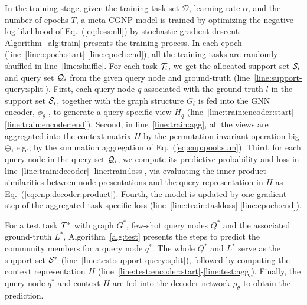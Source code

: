 In the training stage, given the training task set $\mathcal{D}$, learning rate $\alpha$, and the number of epochs $T$, a meta CGNP model is trained by optimizing the negative log-likelihood of Eq.~(\ref{eq:loss:nll}) by stochastic gradient descent. 
Algorithm~\ref{alg:train} presents the training process. 
In each epoch (line~\ref{line:epoch:start}-\ref{line:epoch:end}), all the training tasks are randomly shuffled in line~\ref{line:shuffle}.
For each task $\mathcal{T}_i$, we get the allocated support set $\mathcal{S}_i$ and query set $\mathcal{Q}_i$ from the given query node and ground-truth (line~\ref{line:support-query:split}).  
First, each query node $q$ associated with the ground-truth $l$ in the support set $\mathcal{S}_i$, together with the graph structure $G_i$ is fed into the GNN encoder, $\phi_\theta$ , to generate a query-specific view $H_q$ (line~\ref{line:train:encoder:start}-\ref{line:train:encoder:end}).
Second, in line~\ref{line:train:agg}, all the views are aggregated into the context matrix $H$ by the permutation-invariant operation big $\oplus$, e.g., by the summation aggregation of Eq.~(\ref{eq:cnp:pool:sum}). 
Third, for each query node in the query set $\mathcal{Q}_i$, 
we compute its predictive probability and loss in line~\ref{line:train:decoder}-\ref{line:train:loss}, via evaluating the inner product similarities between node presentations and the query representation in $H$ as Eq.~(\ref{eq:cnp:decoder:product}).
Fourth, the model is updated by one gradient step of the aggregated task-specific loss (line~\ref{line:train:taskloss}-\ref{line:epoch:end}).

	
 For a test task $\mathcal{T}^*$ with graph $G^*$, few-shot query nodes $Q^*$ and the associated ground-truth $L^*$, Algorithm~\ref{alg:test} presents the steps to predict the community members for a query node $q^*$. The whole $Q^*$ and $L^*$ serve as the support set $\mathcal{S}^*$ (line~\ref{line:test:support-query:split}), followed by computing the context representation $H$ (line~\ref{line:test:encoder:start}-\ref{line:test:agg}). 
Finally, the query node $q^*$ and context $H$ are fed into the decoder network $\rho_\theta$ to obtain the prediction.


